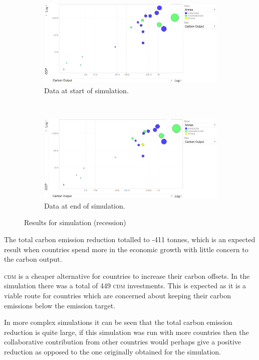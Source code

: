 \begin{figure}[H]
		\centering
        \begin{subfigure}[b]{\textwidth}
                \centering
                \includegraphics[width=\textwidth]{img/simulations/recession-before.png}
				\caption{Data at start of simulation.}
				\label{subfig:recession-1}
        \end{subfigure}
        \\
        \begin{subfigure}[b]{\textwidth}
                \centering
                \includegraphics[width=\textwidth]{img/simulations/recession-after.png}
				\caption{Data at end of simulation.}
				\label{subfig:recession-2}
        \end{subfigure}
        \caption{Results for simulation (recession)}\label{fig:recession}
\end{figure}

The total carbon emission reduction totalled to -411 tonnes, which is an expected result when countries spend more in the economic growth with little concern to the carbon output.

\textsc{cdm} is a cheaper alternative for countries to increase their carbon offsets. In the simulation there was a total of 449 \textsc{cdm} investments. This is expected as it is a viable route for countries which are concerned about keeping their carbon emissions below the emission target.

In more complex simulations it can be seen that the total carbon emission reduction is quite large, if this simulation was run with more countries then the collaborative contribution from other countries would perhaps give a positive reduction as opposed to the one originally obtained for the simulation.
